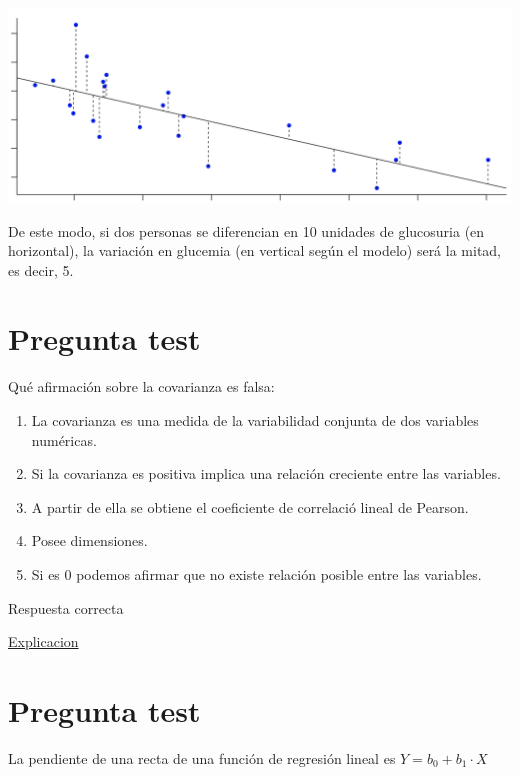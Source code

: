 \documentclass[
]{book}
\providecommand{\tightlist}{%
  \setlength{\itemsep}{0pt}\setlength{\parskip}{0pt}}
\begin{document}
\includegraphics[width=23.72in]{img/4_2}

De este modo, si dos personas se diferencian en 10 unidades de glucosuria (en horizontal), la variación en glucemia (en vertical según el modelo) será la mitad, es decir, 5.

\hypertarget{pregunta-test-134}{%
\section{Pregunta test}\label{pregunta-test-134}}

Qué afirmación sobre la covarianza es falsa:

\begin{enumerate}
\def\labelenumi{\alph{enumi})}
\tightlist
\item
  La covarianza es una medida de la variabilidad conjunta de dos variables numéricas.
\item
  Si la covarianza es positiva implica una relación creciente entre las variables.
\item
  A partir de ella se obtiene el coeficiente de correlació lineal de Pearson.
\item
  Posee dimensiones.
\item
  Si es 0 podemos afirmar que no existe relación posible entre las variables.
\end{enumerate}

Respuesta correcta

\href{https://1fjmanzano.github.io/bioestadistica/relaci\%C3\%B3n-entre-variables-nume\%CC\%81ricas.html\#covarianza}{Explicacion}

\hypertarget{pregunta-test-135}{%
\section{Pregunta test}\label{pregunta-test-135}}

La pendiente de una recta de una función de regresión lineal es \(Y = b_0 + b_1 \cdot X\)
\end{document}
